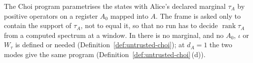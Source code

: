 
The Choi program parametrises the states with Alice's declared marginal
$\tau_A$ by positive operators on a register $A_0$ mapped into $A$. The
frame is asked only to contain the support of $\tau_A$, not to equal
it, so that no run has to decide $\operatorname{rank}\tau_A$ from a computed
spectrum at a window. In  there is no marginal, and no
$A_0$, $\iota$ or $W_{\tau}$ is defined or needed
(Definition~\ref{def:untrusted-choi}); at $d_A=1$ the two modes give the
same program (Definition~\ref{def:untrusted-choi}\,(d)).

